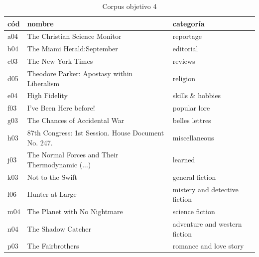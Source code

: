 \documentclass[12pt,letterpaper,twoside]{article}
\begin{document}
   \begin{table}[H]
      \centering
 \begin{tabular}{|l|l|l|}
 \hline
cód & nombre & categoría \\ \hline
        a04 & The Christian Science Monitor & reportage \\ \hline
        b04 & The Miami Herald:September & editorial \\ \hline
        c03 & The New York Times & reviews \\ \hline
        d05 & Theodore Parker: Apostasy within Liberalism & religion \\ \hline
        e04 & High Fidelity & skills \& hobbies \\ \hline
        f03 & I've Been Here before! & popular lore \\ \hline
        g03 & The Chances of Accidental War & belles lettres \\ \hline
        h03 & 87th Congress: 1st Session. House Document No. 247. & miscellaneous \\ \hline
        j03 & The Normal Forces and Their Thermodynamic (...) & learned \\ \hline
        k03 & Not to the Swift & general fiction \\ \hline
        l06 & Hunter at Large & mistery and detective fiction \\ \hline
        m04 & The Planet with No Nightmare & science fiction \\ \hline
        n04 & The Shadow Catcher & adventure and western fiction \\ \hline
        p03 & The Fairbrothers & romance and love story \\ \hline
     
      

      \end{tabular}
  \caption{Corpus objetivo 4}
  \label{tab:corpus_objetivo4}
  \end{table}
\end{document}
